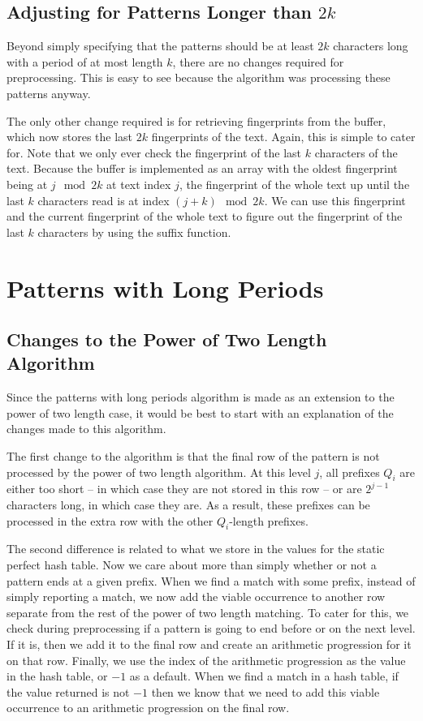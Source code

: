 \documentclass[ %
                    author={Dominic Joseph Moylett},
                    degree={MEng},
                     title={Dictionary Matching with Fingerprints},
                  subtitle={An Empirical Analysis},
                      type={research},
                      year={2015} ]{dissertation}
\begin{document}
\subsection{Adjusting for Patterns Longer than $2k$}

Beyond simply specifying that the patterns should be at least $2k$ characters long with a period of at most length $k$, there are no changes required for preprocessing. This is easy to see because the algorithm was processing these patterns anyway.

The only other change required is for retrieving fingerprints from the buffer, which now stores the last $2k$ fingerprints of the text. Again, this is simple to cater for. Note that we only ever check the fingerprint of the last $k$ characters of the text. Because the buffer is implemented as an array with the oldest fingerprint being at $j \mod 2k$ at text index $j$, the fingerprint of the whole text up until the last $k$ characters read is at index $(j + k) \mod 2k$. We can use this fingerprint and the current fingerprint of the whole text to figure out the fingerprint of the last $k$ characters by using the suffix function.

\section{Patterns with Long Periods}
\label{sec:impl-long}

\subsection{Changes to the Power of Two Length Algorithm}

Since the patterns with long periods algorithm is made as an extension to the power of two length case, it would be best to start with an explanation of the changes made to this algorithm.

The first change to the algorithm is that the final row of the pattern is not processed by the power of two length algorithm. At this level $j$, all prefixes $Q_i$ are either too short -- in which case they are not stored in this row -- or are $2^{j - 1}$ characters long, in which case they are. As a result, these prefixes can be processed in the extra row with the other $Q_i$-length prefixes.

The second difference is related to what we store in the values for the static perfect hash table. Now we care about more than simply whether or not a pattern ends at a given prefix. When we find a match with some prefix, instead of simply reporting a match, we now add the viable occurrence to another row separate from the rest of the power of two length matching. To cater for this, we check during preprocessing if a pattern is going to end before or on the next level. If it is, then we add it to the final row and create an arithmetic progression for it on that row. Finally, we use the index of the arithmetic progression as the value in the hash table, or $-1$ as a default. When we find a match in a hash table, if the value returned is not $-1$ then we know that we need to add this viable occurrence to an arithmetic progression on the final row.
\end{document}

